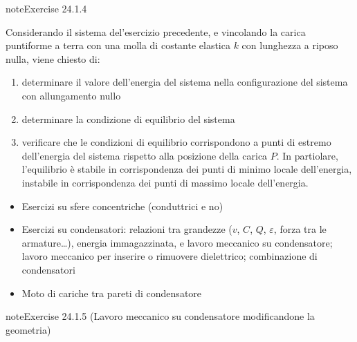 \documentclass[letterpaper,10pt,italian]{jupyterBook}
\begin{document}
\begin{sphinxadmonition}{note}{Exercise 24.1.4}



\sphinxAtStartPar
Considerando il sistema del’esercizio precedente, e vincolando la carica puntiforme a terra con una molla di costante elastica \(k\) con lunghezza a riposo nulla, viene chiesto di:
\begin{enumerate}
%
\item {} 
\sphinxAtStartPar
determinare il valore dell’energia del sistema nella configurazione del sistema con allungamento nullo

\item {} 
\sphinxAtStartPar
determinare la condizione di equilibrio del sistema

\item {} 
\sphinxAtStartPar
verificare che le condizioni di equilibrio corrispondono a punti di estremo dell’energia del sistema rispetto alla posizione della carica \(P\). In partiolare, l’equilibrio è stabile in corrispondenza dei punti di minimo locale dell’energia, instabile in corrispondenza dei punti di massimo locale dell’energia.

\end{enumerate}
\end{sphinxadmonition}
\begin{itemize}
\item {} 
\sphinxAtStartPar
Esercizi su sfere concentriche (conduttrici e no)

\item {} 
\sphinxAtStartPar
Esercizi su condensatori: relazioni tra grandezze (\(v\), \(C\), \(Q\), \(\varepsilon\), forza tra le armature…), energia immagazzinata, e lavoro meccanico su condensatore; lavoro meccanico per inserire o rimuovere dielettrico; combinazione di condensatori

\item {} 
\sphinxAtStartPar
Moto di cariche tra pareti di condensatore

\end{itemize}
 \label{exercise:ch/electromagnetism/electrostatics-problems-exercise-4}

\begin{sphinxadmonition}{note}{Exercise 24.1.5 (Lavoro meccanico su condensatore modificandone la geometria)}


\end{sphinxadmonition}
 \label{exercise:ch/electromagnetism/electrostatics-problems-exercise-5}
\end{document}
